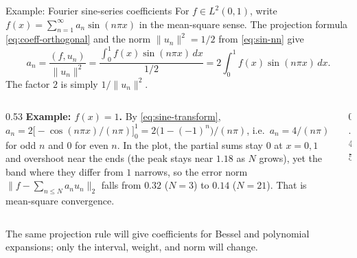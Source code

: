 \documentclass[11pt]{beamer}
\begin{document}
\begin{frame}{Example: Fourier sine-series coefficients}
\footnotesize
For $f\in L^2(0,1)$, write $f(x)=\sum_{n=1}^{\infty}a_n\sin(n\pi x)$ in the
mean-square sense.  The projection formula \eqref{eq:coeff-orthogonal} and the norm
$\|u_n\|^2=1/2$ from \eqref{eq:sin-nn} give
\begin{equation}
 a_n=\frac{(f,u_n)}{\|u_n\|^2}
 =\frac{\int_0^1 f(x)\sin(n\pi x)\,dx}{1/2}
 =2\int_0^1 f(x)\sin(n\pi x)\,dx.\label{eq:sine-transform}
\end{equation}
The factor $2$ is simply $1/\|u_n\|^2$.

\begin{columns}[T]
\begin{column}{0.53\textwidth}
\textbf{Example: $f(x)=1$.} By \eqref{eq:sine-transform},
$a_n=2\bigl[-\cos(n\pi x)/(n\pi)\bigr]_0^1=2\bigl(1-(-1)^n\bigr)/(n\pi)$,
i.e.\ $a_n=4/(n\pi)$ for odd $n$ and $0$ for even $n$.  In the plot, the partial
sums stay $0$ at $x=0,1$ and overshoot near the ends (the peak stays near $1.18$ as
$N$ grows), yet the band
where they differ from $1$ narrows, so the error norm
$\|f-\sum_{n\le N}a_nu_n\|_2$ falls from $0.32$ ($N=3$) to $0.14$ ($N=21$).
That is mean-square convergence.
\end{column}
\begin{column}{0.45\textwidth}
\end{column}
\end{columns}

\smallskip
The same projection rule will give coefficients for Bessel and polynomial expansions;
only the interval, weight, and norm will change.
\end{frame}
\end{document}
